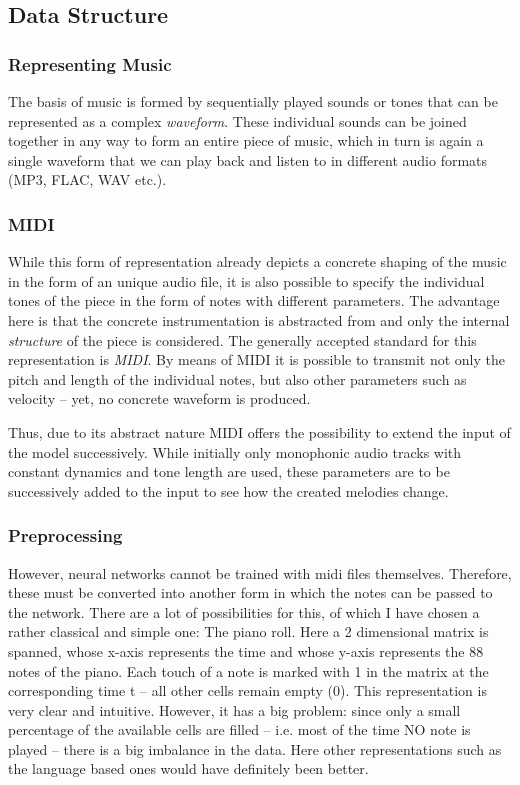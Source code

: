 \documentclass[a4paper, 10pt, xcolor=dvipsnames]{article} %
\begin{document}
\subsection{Data Structure}

\subsubsection{Representing Music}

The basis of music is formed by sequentially played sounds or tones that can
be represented as a complex \emph{waveform}. These individual sounds can be joined
together in any way to form an entire piece of music, which in turn is again a
single waveform that we can play back and listen to in different audio
formats (MP3, FLAC, WAV etc.).

\subsubsection{MIDI}

While this form of representation already depicts a concrete shaping of the
music in the form of an unique audio file, it is also possible to specify the
individual tones of the piece in the form of notes with different parameters.
The advantage here is that the concrete instrumentation is abstracted from and
only the internal \emph{structure} of the piece is considered. The generally
accepted standard for this representation is \emph{MIDI}. By means of MIDI it
is possible to transmit not only the pitch and length of the individual notes,
but also other parameters such as velocity -- yet, no concrete waveform is
produced.

Thus, due to its abstract nature MIDI offers the possibility to extend the
input of the model successively. While initially only monophonic audio tracks
with constant dynamics and tone length are used, these parameters are to be
successively added to the input to see how the created melodies change.

\subsubsection{Preprocessing}
However, neural networks cannot be trained with midi files themselves.
Therefore, these must be converted into another form in which the notes can be
passed to the network. There are a lot of possibilities for this, of which I
have chosen a rather classical and simple one: The piano roll. Here a 2
dimensional matrix is spanned, whose x-axis represents the time and whose
y-axis represents the 88 notes of the piano. Each touch of a note is marked
with 1 in the matrix at the corresponding time t -- all other cells remain empty
(0). This representation is very clear and intuitive. However, it has a big
problem: since only a small percentage of the available cells are filled --
i.e. most of the time NO note is played -- there is a big imbalance in the
data. Here other representations such as the language based ones would have
definitely been better.
\end{document}
